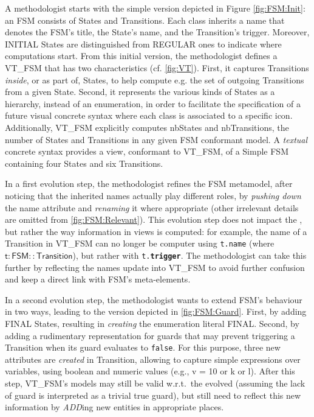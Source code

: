 A methodologist starts with the simple version depicted in Figure \ref{fig:FSM:Init}:
an \textsf{FSM} consists of \textsf{State}s and \textsf{Transition}s. Each class
inherits a \textsf{name} that denotes the \textsf{FSM}'s title, the \textsf{State}'s
name, and the \textsf{Transition}'s trigger. Moreover, \textsf{INITIAL} \textsf{State}s
are distinguished from \textsf{REGULAR} ones to indicate where computations start.
From this initial version, the methodologist defines a \viewtype \textsf{VT\_FSM}
that has two characteristics (cf. \autoref{fig:VT}). First, it captures \textsf{Transition}s \emph{inside},
or as part of, \textsf{State}s, to help compute e.g. the set of outgoing 
\textsf{Transition}s from a given \textsf{State}. Second, it represents the various
\textsf{kind}s of \textsf{State}s as a hierarchy, instead of an enumeration,
in order to facilitate the specification of a future visual concrete syntax where
each class is associated to a specific icon.
Additionally, \textsf{VT\_FSM} explicitly computes \textsf{nbStates} and 
\textsf{nbTransitions}, the number of \textsf{State}s and \textsf{Transition}s 
in any given \textsf{FSM} conformant model. A \emph{textual} concrete syntax 
provides a view, conformant to \textsf{VT\_FSM}, of a \textsf{Simple FSM} containing
four \textsf{State}s and six \textsf{Transition}s.


In a first evolution step, the methodologist refines the \textsf{FSM} metamodel,
after noticing that the inherited \textsf{name}s actually play different roles,
by  \emph{pushing down} the \textsf{name} attribute and \emph{renaming} it where
appropriate (other irrelevant details are omitted from \autoref{fig:FSM:Relevant}). 
This evolution step does not impact the \viewtypes, but rather the way information
in views is computed: for example, the \textsf{name} of a \textsf{Transition} in
\textsf{VT\_FSM} can no longer be computer using \texttt{t.name} (where 
$\mathsf{t : FSM::Transition}$), but rather with \texttt{t.\textbf{trigger}}. 
The methodologist can take this further by reflecting the \textsf{name}s update
into \textsf{VT\_FSM} to avoid further confusion and keep a direct link with
\textsf{FSM}'s meta-elements.

In a second evolution step, the methodologist wants to extend \textsf{FSM}'s 
behaviour in two ways, leading to the version depicted in \autoref{fig:FSM:Guard}. First, by adding \textsf{FINAL} \textsf{State}s,
resulting in \emph{creating} the enumeration literal \textsf{FINAL}.
Second, by adding a rudimentary representation for guards that may prevent 
triggering a \textsf{Transition} when its guard evaluates to \texttt{false}. 
For this purpose, three new attributes are \emph{created} in \textsf{Transition}, allowing to capture
simple expressions over \textsf{var}iables, using boolean and numeric \textsf{value}s
(e.g., \textsf{v = 10} or \textsf{k or l}). After this step, \textsf{VT\_FSM}'s
models may still be valid w.r.t.~the evolved \metamodel (assuming the lack of 
guard is interpreted as a trivial \textsf{true} guard),
but \viewtypes still need  to reflect this new information by \emph{ADD}ing new 
entities in appropriate places.


